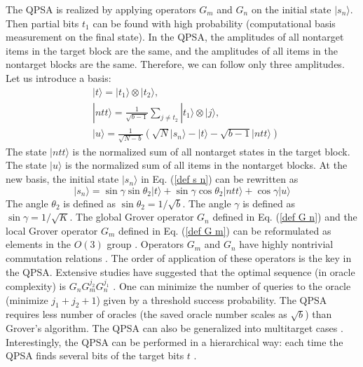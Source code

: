 \documentclass[%
 twocolumn,
 10pt,
 superscriptaddress,
 longbibliography,
 amsmath,amssymb,
 aps,
 pra,
floatfix,
]{revtex4-1}
\begin{document}
The QPSA is realized by  applying operators $G_{m}$ and $G_{n}$ on the initial state $|s_n\rangle$. Then partial bits $t_1$ can be found with high probability (computational basis measurement on the final state). In the QPSA, the amplitudes of all nontarget items in the target block are the same, and the amplitudes of all items in the nontarget blocks are the same. Therefore, we can follow only three amplitudes. Let us introduce a basis:
\begin{subequations}
	\begin{align}
	\label{basis t} &|t\rangle = |t_1\rangle\otimes |t_2\rangle, \\
	\label{basis ntt} &|ntt\rangle = \frac 1 {\sqrt{b-1}}\sum_{j\neq t_2}|t_1\rangle\otimes |j\rangle, \\
	\label{basis u} &|u\rangle =  \frac{1}{\sqrt{N-b}}\left(\sqrt N|s_n\rangle-|t\rangle-\sqrt{b-1}|ntt\rangle\right)
	\end{align}
\end{subequations}
The state $|ntt\rangle$ is the normalized sum of all nontarget states in the target block. The state $|u\rangle$ is the normalized sum of all items in the nontarget blocks. At the new basis, the initial state $|s_n\rangle$ in Eq. (\ref{def s n}) can be rewritten as
\begin{equation}
\label{def s n rewrite}
    |s_n\rangle = \sin \gamma \sin\theta_2|t\rangle + \sin \gamma \cos\theta_2|ntt\rangle+\cos\gamma |u\rangle
\end{equation}
The angle $\theta_2$ is defined as $\sin\theta_2 = 1/\sqrt b$. The angle $\gamma$ is defined as $\sin\gamma = 1/\sqrt K$. The global Grover operator $G_n$ defined in Eq. (\ref{def G n}) and the local Grover operator $G_m$ defined in Eq. (\ref{def G m}) can be reformulated as elements in the $O(3)$ group \cite{KV06}. Operators $G_{m}$ and $G_{n}$ have highly nontrivial commutation relations \cite{KV06}. The order of application of these operators is the key in the QPSA. Extensive studies have suggested that the optimal sequence (in oracle complexity) is $G_nG_m^{j_2}G_n^{j_1}$ \cite{KL06,KV06}. One can minimize the number of queries to the oracle (minimize $j_1+j_2+1$) given by a threshold success probability. The QPSA requires less number of oracles (the saved oracle number scales as $\sqrt b$) than Grover's algorithm. The QPSA can also be generalized into multitarget cases \cite{CK07,ZK18}. Interestingly, the QPSA can be performed in a hierarchical way: each time the QPSA finds several bits of the target bits $t$ \cite{KX07}.
\end{document}

